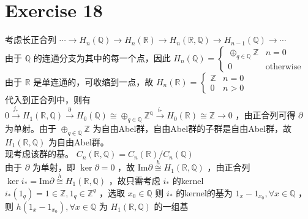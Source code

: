 \documentclass[12pt]{article}
\begin{document}
\section{Exercise 18}
考虑长正合列 $\cdots \to H_n(\mathbb{Q})\to H_n(\mathbb{R})\to H_n(\mathbb{R},\mathbb{Q})\to H_{n-1}(\mathbb{Q})\to\cdots$ \\
由于 $\mathbb{Q}$ 的连通分支为其中的每一个点，因此 $H_n(\mathbb{Q})=\begin{cases} \oplus_{q\in \mathbb{Q}}\mathbb{Z} & n=0\\0 & \textrm{otherwise}\end{cases}$\\
由于 $\mathbb{R}$ 是单连通的，可收缩到一点，故 
$H_n(\mathbb{R})=\begin{cases}\mathbb{Z}& n=0\\0& n > 0\end{cases}$\\
代入到正合列中，则有 $0\stackrel{j_*}{\to}H_1(\mathbb{R}, \mathbb{Q})\stackrel{\partial}{\to}H_0(\mathbb{Q})\cong \oplus_{q\in \mathbb{Q}} \mathbb{Z^q} \stackrel{i_*}{\to}H_0(\mathbb{R})\cong \mathbb{Z} \to 0$ ，由正合列可得 $\partial$ 为单射。由于 $\oplus_{q\in \mathbb{Q}} \mathbb{Z}$ 为自由Abel群，自由Abel群的子群是自由Abel群，故 $H_1(\mathbb{R},\mathbb{Q})$ 为自由Abel群。\\
现考虑该群的基。 $C_n(\mathbb{R},\mathbb{Q}) = C_n(\mathbb{R})/C_n(\mathbb{Q})$\\
由于 $\partial$ 为单射，即 $\ker \partial=0$ ，故 $\textrm{Im}\partial \stackrel{h}{\cong} H_1(\mathbb{R},\mathbb{Q})$ ，由正合列 $\ker i_*=\textrm{Im} \partial \stackrel{h}{\cong} H_1(\mathbb{R},\mathbb{Q})$ ，故只需考虑 $i_*$ 的kernel\\
$i_*(1_q)=1\in \mathbb{Z},1_q\in \mathbb{Z}^q$ ，选取 $x_0\in \mathbb{Q}$ 则 $i_*$ 的kernel的基为 $1_x-1_{x_0},\forall x\in \mathbb{Q}$ ，则 $h(1_x-1_{x_0}),\forall x\in \mathbb{Q}$ 为 $H_1(\mathbb{R},\mathbb{Q})$ 的一组基
\end{document}
